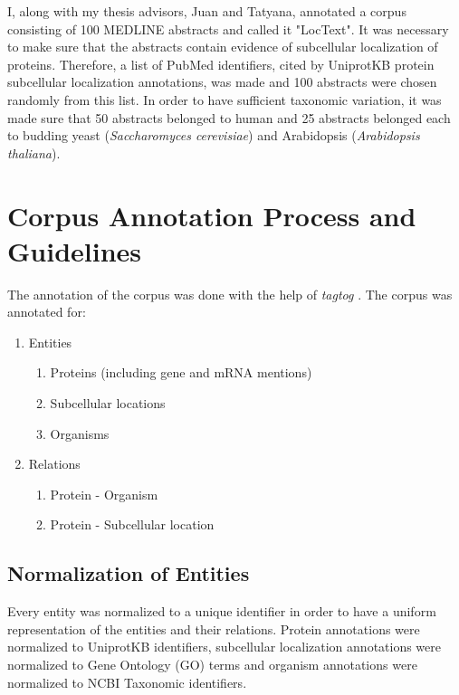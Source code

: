 I, along with my thesis advisors, Juan and Tatyana, annotated a corpus consisting of 100 MEDLINE \cite{medline} abstracts and called it "LocText". It was necessary to make sure that the abstracts contain evidence of subcellular localization of proteins. Therefore, a list of PubMed \cite{pubmed} identifiers, cited by UniprotKB \cite{magrane2011uniprot} protein subcellular localization annotations, was made and 100 abstracts were chosen randomly from this list. In order to have sufficient taxonomic variation, it was made sure that 50 abstracts belonged to human and 25 abstracts belonged each to budding yeast (\textit{Saccharomyces cerevisiae}) and Arabidopsis (\textit{Arabidopsis thaliana}).

\section{Corpus Annotation Process and Guidelines}

The annotation of the corpus was done with the help of \textit{tagtog} \cite{cejuela2014tagtog}. The corpus was annotated for:

\begin{enumerate}
\item Entities
\begin{enumerate}
\item Proteins (including gene and mRNA mentions)
\item Subcellular locations
\item Organisms
\end{enumerate}
\item Relations
\begin{enumerate}
\item Protein - Organism
\item Protein - Subcellular location
\end{enumerate}
\end{enumerate}

\subsection*{Normalization of Entities}

Every entity was normalized to a unique identifier in order to have a uniform representation of the entities and their relations. Protein annotations were normalized to UniprotKB \cite{magrane2011uniprot} identifiers, subcellular localization annotations were normalized to Gene Ontology (GO) \cite{ashburner2000gene} terms and organism annotations were normalized to NCBI Taxonomic \cite{ncbiTaxonomy} identifiers.

